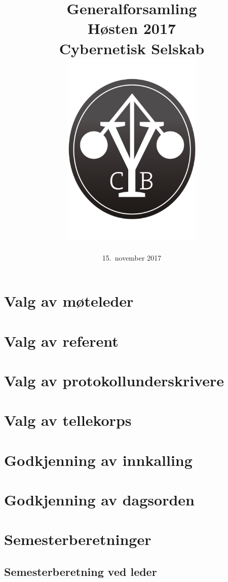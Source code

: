 \documentclass[10pt,norsk,a4paper]{article}
\title{Generalforsamling \\
	Høsten 2017\\
	Cybernetisk Selskab\\[2cm]
	\includegraphics[width=0.5\textwidth]{cyblogoa3.pdf}\\[-.5cm]}
\date{15.\ november 2017}
\begin{document}
\maketitle{}
\newpage

\tableofcontents{}



\section{Valg av møteleder}

\section{Valg av referent}

\section{Valg av protokollunderskrivere}

\section{Valg av tellekorps}

\section{Godkjenning av innkalling}

\section{Godkjenning av dagsorden}

\section{Semesterberetninger}
\subsection{Semesterberetning ved leder}
\end{document}
